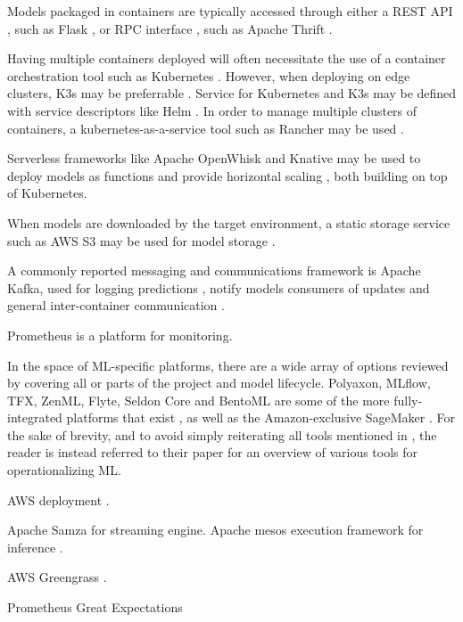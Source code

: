 Models packaged in containers are typically accessed through either a REST API \cite{Garcia2020, Paeaekkoenen2020}, such as Flask \cite{Gupta2020}, or RPC interface \cite{Ruf2021, Crankshaw2017}, such as Apache Thrift \cite{Li2017}.

Having multiple containers deployed will often necessitate the use of a container orchestration tool such as Kubernetes \cite{Liu2020, Richins2020, Paeaekkoenen2020, Rausch2019a}.
However, when deploying on edge clusters, K3s may be preferrable \cite{Paeaekkoenen2020}.
Service for Kubernetes and K3s may be defined with service descriptors like Helm \cite{Paeaekkoenen2020}.
In order to manage multiple clusters of containers, a kubernetes-as-a-service tool such as Rancher may be used \cite{Paeaekkoenen2020}.

Serverless frameworks like Apache OpenWhisk and Knative may be used to deploy models as functions and provide horizontal scaling \cite{Rausch2019a, Garcia2020}, both building on top of Kubernetes.

When models are downloaded by the target environment, a static storage service such as AWS S3 may be used for model storage \cite{Liu2020, Chahal2020}.

A commonly reported messaging and communications framework is Apache Kafka, used for logging predictions \cite{Li2017}, notify models consumers of updates \cite{Liu2020,Garcia2020} and general inter-container communication \cite{Richins2020}.

Prometheus is a platform for monitoring.

In the space of ML-specific platforms, there are a wide array of options reviewed by \cite{Ruf2021} covering all or parts of the project and model lifecycle.
Polyaxon, MLflow, TFX, ZenML, Flyte, Seldon Core and BentoML are some of the more fully-integrated platforms that exist \cite{Chen2020, Ruf2021}, as well as the Amazon-exclusive SageMaker \cite{Ruf2021, Chahal2020}.
For the sake of brevity, and to avoid simply reiterating all tools mentioned in \cite{Ruf2021}, the reader is instead referred to their paper for an overview of various tools for operationalizing ML.

AWS deployment \cite{Krishnamurthi2019, Liu2020,Chahal2020}.

Apache Samza \cite{Li2017} for streaming engine.
Apache mesos execution framework for inference \cite{Garcia2020}.

AWS Greengrass \cite{Krishnamurthi2019}.

Prometheus \cite{Ruf2021}
Great Expectations \cite{Ruf2021}

